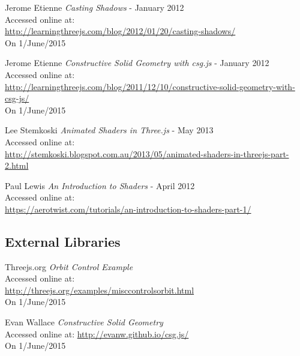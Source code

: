 \begin{thebibliography}{99}
        Jerome Etienne
        \textit{Casting Shadows} - January 2012 \\
        Accessed online at: \\
        \href{http://learningthreejs.com/blog/2012/01/20/casting-shadows/}{http://learningthreejs.com/blog/2012/01/20/casting-shadows/}\\
        On 1/June/2015

        Jerome Etienne
        \textit{Constructive Solid Geometry with csg.js} - January 2012 \\
        Accessed online at: \\
        \href{http://learningthreejs.com/blog/2011/12/10/constructive-solid-geometry-with-csg-js/}{http://learningthreejs.com/blog/2011/12/10/constructive-solid-geometry-with-csg-js/}\\
        On 1/June/2015

        Lee Stemkoski
        \textit{Animated Shaders in Three.js} - May 2013 \\
        Accessed online at: \\
        \href{http://stemkoski.blogspot.com.au/2013/05/animated-shaders-in-threejs-part-2.html}{http://stemkoski.blogspot.com.au/2013/05/animated-shaders-in-threejs-part-2.html}

        Paul Lewis
        \textit{An Introduction to Shaders} - April 2012 \\
        Accessed online at: \\
        \href{https://aerotwist.com/tutorials/an-introduction-to-shaders-part-1/}{https://aerotwist.com/tutorials/an-introduction-to-shaders-part-1/}



\subsection{External Libraries}
        Threejs.org
        \textit{Orbit Control Example} \\
        Accessed online at: \\
        \href{http://threejs.org/examples/misc_controls_orbit.html}{http://threejs.org/examples/misc{\textunderscore}controls{\textunderscore}orbit.html} \\
        On 1/June/2015

        Evan Wallace
        \textit{Constructive Solid Geometry}\\
        Accessed online at:
        \href{http://evanw.github.io/csg.js/}{http://evanw.github.io/csg.js/} \\
        On 1/June/2015


\end{thebibliography}

